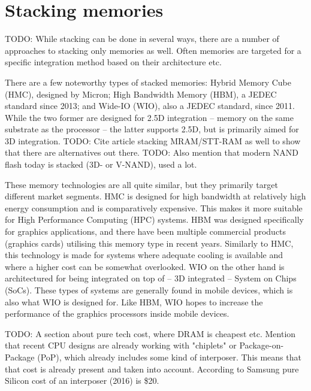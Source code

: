\section{Stacking memories}
TODO: While stacking can be done in several ways, there are a number of approaches to stacking only memories as well. Often memories are targeted for a specific integration method based on their architecture etc. 

There are a few noteworthy types of stacked memories: Hybrid Memory Cube (HMC), designed by Micron; High Bandwidth Memory (HBM), a JEDEC standard since 2013; and Wide-IO (WIO), also a JEDEC standard, since 2011. While the two former are designed for 2.5D integration -- memory on the same substrate as the processor -- the latter supports 2.5D, but is primarily aimed for 3D integration. TODO: Cite article stacking MRAM/STT-RAM as well to show that there are alternatives out there. TODO: Also mention that modern NAND flash today is stacked (3D- or V-NAND), used a lot. 
\bigskip

These memory technologies are all quite similar, but they primarily target different market segments. HMC is designed for high bandwidth at relatively high energy consumption and is comparatively expensive. This makes it more suitable for High Performance Computing (HPC) systems. HBM was designed specifically for graphics applications, and there have been multiple commercial products (graphics cards) utilising this memory type in recent years. Similarly to HMC, this technology is made for systems where adequate cooling is available and where a higher cost can be somewhat overlooked. WIO on the other hand is architectured for being integrated on top of -- 3D integrated -- System on Chips (SoCs). These types of systems are generally found in mobile devices, which is also what WIO is designed for. Like HBM, WIO hopes to increase the performance of the graphics processors inside mobile devices. 
\bigskip

TODO: A section about pure tech cost, where DRAM is cheapest etc. Mention that recent CPU designs are already working with "chiplets" or Package-on-Package (PoP), which already includes some kind of interposer. This means that that cost is already present and taken into account. According to Samsung pure Silicon cost of an interposer (2016) is \$20.


